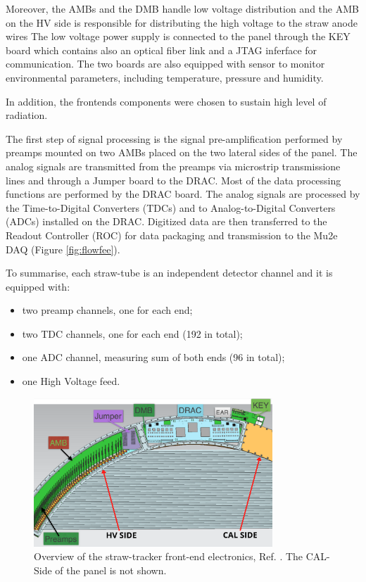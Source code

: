 Moreover, the AMBs and the DMB handle 
low voltage distribution and the AMB on the HV side is responsible for 
distributing the high voltage to the straw anode wires
The low voltage power supply is connected to the panel through the KEY board which 
contains also an optical fiber link and a JTAG inferface for communication.
The two boards are also equipped with sensor to monitor environmental parameters, 
including temperature, pressure and humidity.

In addition, the frontends components were chosen to sustain high level of radiation.

The first step of signal processing is the signal pre-amplification performed 
by preamps mounted on two AMBs placed on the two lateral sides of the panel. 
The analog signals are transmitted from the preamps via 
microstrip transmissione lines and through a Jumper board to the DRAC.
Most of the data processing functions are performed by the DRAC board. 
The analog signals are processed by the Time-to-Digital Converters 
(TDCs) and to Analog-to-Digital Converters 
(ADCs) installed on the DRAC. Digitized data are then transferred to the Readout 
Controller (ROC) for data packaging and transmission to the Mu2e DAQ 
(Figure \ref{fig:flowfee}). 

To summarise, each straw-tube is an independent detector channel and it is equipped with:
\begin{itemize}
    \item two preamp channels, one for each end;
    \item two TDC channels, one for each end (192 in total);
    \item one ADC channel, measuring sum of both ends (96 in total);
    \item one High Voltage feed.
\end{itemize}
\begin{figure}[!h]
\centering
\includegraphics[width =0.8\textwidth]{figures/png/Screenshot_20240131_111836.png}
\caption{Overview of the straw-tracker front-end electronics, Ref.  
\cite{vadimmu2e}. The CAL-Side of the panel is not shown.}
\label{fig:trackerfee}
\end{figure}


